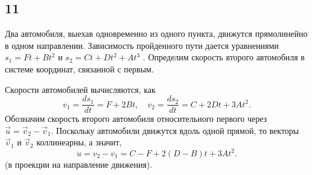 \subsection{11}

Два автомобиля, выехав одновременно из одного пункта, движутся прямолинейно в одном направлении. Зависимость пройденного пути дается уравнениями $s_1=Ft+Bt^2$ и $ s_2=Ct+Dt^2+At^3$ . Определим скорость второго автомобиля в системе координат, связанной с первым.

Скорости автомобилей вычисляются, как
\[
v_1=\frac{ds_1}{dt}=F+2Bt,\quad v_2=\frac{ds_2}{dt}=C+2Dt+3At^2.
\]
Обозначим скорость второго автомобиля относительного первого через $\vec u=\vec v_2-\vec v_1$. Поскольку автомобили движутся вдоль одной прямой, то векторы $\vec v_1$ и $\vec v_2$ коллинеарны, а значит,
\[
u=v_2-v_1=C-F+2(D-B)t+3At^2.
\]
(в проекции на направление движения).